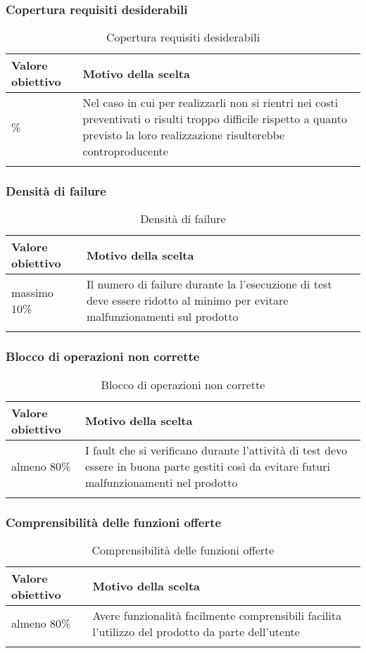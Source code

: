 \documentclass[../PianoDiQualifica.tex]{subfiles}
\begin{document}
		\subsubsection{Copertura requisiti desiderabili}
			\begin{longtable}[c] { >{\centering\arraybackslash}p{4cm} p{7cm} }
				\toprule
				\centerline{\textbf{Valore obiettivo}} & \centerline{\textbf{Motivo della scelta}} \\
				\midrule
					80\% &	Nel caso in cui per realizzarli non si rientri nei costi preventivati o risulti troppo difficile rispetto a quanto previsto la loro realizzazione risulterebbe controproducente \\
				\bottomrule
				\caption{Copertura requisiti desiderabili}
			\end{longtable}
			
		\subsubsection{Densità di failure}
			\begin{longtable}[c] { >{\centering\arraybackslash}p{4cm} p{7cm} }
				\toprule
				\centerline{\textbf{Valore obiettivo}} & \centerline{\textbf{Motivo della scelta}} \\
				\midrule
					massimo 10\% & Il numero di failure durante la l'esecuzione di test deve essere ridotto al minimo per evitare malfunzionamenti sul prodotto \\
				\bottomrule
				\caption{Densità di failure}
			\end{longtable}
			
		\subsubsection{Blocco di operazioni non corrette}
			\begin{longtable}[c] { >{\centering\arraybackslash}p{4cm} p{7cm} }
				\toprule
				\centerline{\textbf{Valore obiettivo}} & \centerline{\textbf{Motivo della scelta}} \\
				\midrule
					almeno 80\% & I fault che si verificano durante l'attività di test devo essere in buona parte gestiti così da evitare futuri malfunzionamenti nel prodotto \\
				\bottomrule
				\caption{Blocco di operazioni non corrette}
			\end{longtable}
			
		\subsubsection{Comprensibilità delle funzioni offerte}
			\begin{longtable}[c] { >{\centering\arraybackslash}p{4cm} p{7cm} }
				\toprule
				\centerline{\textbf{Valore obiettivo}} & \centerline{\textbf{Motivo della scelta}} \\
				\midrule
					almeno 80\% & Avere funzionalità facilmente comprensibili facilita l'utilizzo del prodotto da parte dell'utente \\
				\bottomrule
				\caption{Comprensibilità delle funzioni offerte}
			\end{longtable}
			
\end{document}
